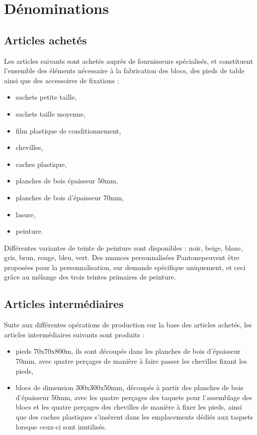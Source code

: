 \section{Dénominations}

\subsection{Articles achetés}

Les articles suivants sont achetés auprès de fournisseurs spécialisés,
et constituent l'ensemble des éléments nécessaire à la fabrication des blocs,
des pieds de table ainsi que des accessoires de fixations :

\begin{itemize}
	\item sachets petite taille,
	\item sachets taille moyenne,
	\item film plastique de conditionnement,
	\item chevilles,
	\item caches plastique,
	\item planches de bois épaisseur 50mm,
	\item planches de bois d'épaisseur 70mm,
	\item lasure,
	\item peinture.
\end{itemize}

Différentes variantes de teinte de peinture sont disponibles :
noir, beige, blanc, gris, brun, rouge, bleu, vert.
Des nuances personnalisées Pantone\textregistered peuvent être proposées
pour la personnalisation, sur demande spécifique uniquement, et ceci grâce
au mélange des trois teintes primaires de peinture.

\subsection{Articles intermédiaires}

Suite aux différentes opérations de production sur la base des articles
achetés, les articles intermédiaires suivants sont produits :

\begin{itemize}
	\item pieds 70x70x800m, ils sont découpés dans les planches de bois
	d'épaisseur 70mm, avec quatre perçages de manière à faire passer les chevilles
	fixant les pieds,
	\item blocs de dimension 300x300x50mm, découpés à partir des planches de
	bois d'épaisseur 50mm, avec les quatre perçages des taquets pour l'assemblage
	des blocs et les quatre perçages des chevilles de manière à fixer les pieds,
	ainsi que des caches plastiques s'insèrent dans les emplacements dédiés
	aux taquets lorsque ceux-ci sont inutilisés.
\end{itemize}


